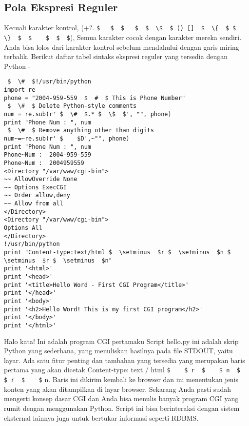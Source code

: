 \begin {enumerate}
\begin {enumerate}
\subsection{Pola Ekspresi Reguler}
Kecuali karakter kontrol, (+?.  \verb|$   $  $   $  $  \$  $ () []  $  \{  $ $  \}  $  $    $  $  $|), Semua karakter cocok dengan karakter mereka sendiri. Anda bisa lolos dari karakter kontrol sebelum mendahului dengan garis miring terbalik.
Berikut daftar tabel sintaks ekspresi reguler yang tersedia dengan Python -
\begin{verbatim}
 $  \#  $!/usr/bin/python
import re
phone = "2004-959-559  $  #  $ This is Phone Number"
 $  \#  $ Delete Python-style comments
num = re.sub(r' $  \#  $.* $  \$  $', "", phone)
print "Phone Num : ", num
 $  \#  $ Remove anything other than digits
num~=~re.sub(r' $    $D',~"", phone)
print "Phone Num : ", num
Phone~Num :  2004-959-559
Phone~Num :  2004959559
<Directory "/var/www/cgi-bin">
~~ AllowOverride None
~~ Options ExecCGI
~~ Order allow,deny
~~ Allow from all
</Directory>
<Directory "/var/www/cgi-bin">
Options All
</Directory>
!/usr/bin/python
print "Content-type:text/html $  \setminus  $r $  \setminus  $n $  \setminus  $r $  \setminus  $n"
print '<html>'
print '<head>'
print '<title>Hello Word - First CGI Program</title>'
print '</head>'
print '<body>'
print '<h2>Hello Word! This is my first CGI program</h2>'
print '</body>'
print '</html>'
\end{verbatim}
Halo kata! Ini adalah program CGI pertamaku
Script hello.py ini adalah skrip Python yang sederhana, yang menuliskan hasilnya pada file STDOUT, yaitu layar. Ada satu fitur penting dan tambahan yang tersedia yang merupakan baris pertama yang akan dicetak Content-type: text / html  \verb|$    $ r  $    $ n  $    $ r  $    $| n. Baris ini dikirim kembali ke browser dan ini menentukan jenis konten yang akan ditampilkan di layar browser. Sekarang Anda pasti sudah mengerti konsep dasar CGI dan Anda bisa menulis banyak program CGI yang rumit dengan menggunakan Python. Script ini bisa berinteraksi dengan sistem eksternal lainnya juga untuk bertukar informasi seperti RDBMS.

\end{enumerate}
\end{enumerate}
